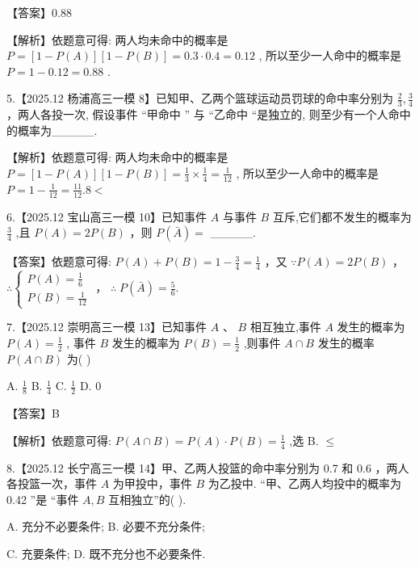 \documentclass[10pt]{article}
\begin{document}
【答案】0.88

【解析】依题意可得: 两人均未命中的概率是 \(P = \left\lbrack  {1 - P\left( A\right) }\right\rbrack  \left\lbrack  {1 - P\left( B\right) }\right\rbrack   = {0.3} \cdot  {0.4} = {0.12}\) , 所以至少一人命中的概率是 \(P = 1 - {0.12} = {0.88}\) .

5.【2025.12 杨浦高三一模 8】已知甲、乙两个篮球运动员罚球的命中率分别为 \(\frac{2}{3},\frac{3}{4}\) ，两人各投一次, 假设事件 “甲命中 ” 与 “乙命中 “是独立的, 则至少有一个人命中的概率为\_\_\_\_\_.

【解析】依题意可得: 两人均未命中的概率是 \(P = \left\lbrack  {1 - P\left( A\right) }\right\rbrack  \left\lbrack  {1 - P\left( B\right) }\right\rbrack   = \frac{1}{3} \times  \frac{1}{4} = \frac{1}{12}\) , 所以至少一人命中的概率是 \(P = 1 - \frac{1}{12} = \frac{11}{12}{.8} <\)

6.【2025.12 宝山高三一模 10】已知事件 \(A\) 与事件 \(B\) 互斥,它们都不发生的概率为 \(\frac{3}{4}\) ,且 \(P\left( A\right)  = {2P}\left( B\right)\) ，则 \(P\left( \bar{A}\right)  =\) \_\_\_\_\_.

【答案】依题意可得: \(P\left( A\right)  + P\left( B\right)  = 1 - \frac{3}{4} = \frac{1}{4}\) ，又 \(\because P\left( A\right)  = {2P}\left( B\right)\) ， \(\therefore \left\{  \begin{array}{l} P\left( A\right)  = \frac{1}{6} \\  P\left( B\right)  = \frac{1}{12} \end{array}\right.\) ， \(\therefore \; P\left( \bar{A}\right)  = \frac{5}{6}.\)

7.【2025.12 崇明高三一模 13】已知事件 \(A\text{ 、 }B\) 相互独立,事件 \(A\) 发生的概率为 \(P\left( A\right)  = \frac{1}{2}\) , 事件 \(B\) 发生的概率为 \(P\left( B\right)  = \frac{1}{2}\) ,则事件 \(A \cap  B\) 发生的概率 \(P\left( {A \cap  B}\right)\) 为( )

A. \(\frac{1}{8}\) B. \(\frac{1}{4}\) C. \(\frac{1}{2}\) D. 0

【答案】B

【解析】依题意可得: \(P\left( {A \cap  B}\right)  = P\left( A\right)  \cdot  P\left( B\right)  = \frac{1}{4}\) ,选 B. \(\leq\)

8.【2025.12 长宁高三一模 14】甲、乙两人投篮的命中率分别为 0.7 和 0.6 ，两人各投篮一次，事件 \(A\) 为甲投中，事件 \(B\) 为乙投中. “甲、乙两人均投中的概率为 0.42 ”是 “事件 \(A,B\) 互相独立”的( ).

A. 充分不必要条件; B. 必要不充分条件;

C. 充要条件; D. 既不充分也不必要条件.
\end{document}
